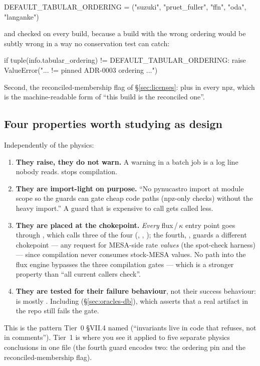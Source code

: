 \begin{srclisting}
DEFAULT_TABULAR_ORDERING = ("suzuki", "pruet_fuller", "ffn", "oda", "langanke")
\end{srclisting}

and checked on every build, because a build with the wrong ordering would be
subtly wrong in a way no conservation test can catch:

\begin{srclisting}
if tuple(info.tabular_ordering) != DEFAULT_TABULAR_ORDERING:
    raise ValueError("... != pinned ADR-0003 ordering ...")
\end{srclisting}

Second, the reconciled-membership flag of \S\ref{sec:licenses}:
 plus  in every
npz, which is the machine-readable form of ``this build is the reconciled one''.

\subsection{Four properties worth studying as design}
\label{sec:guard-design}

Independently of the physics:

\begin{enumerate}
\item \textbf{They raise, they do not warn.} A warning in a batch job is a log
      line nobody reads.  stops compilation.
\item \textbf{They are import-light on purpose.} ``No pynucastro import at
      module scope so the guards can gate cheap code paths (npz-only checks)
      without the heavy import.'' A guard that is expensive to call gets called
      less.
\item \textbf{They are placed at the chokepoint.} \emph{Every} flux\,/\,$\kappa$
      entry point goes through , which calls three of the
      four (, ,
      ); the fourth, ,
      guards a different chokepoint --- any request for MESA-side rate
      \emph{values} (the spot-check harness) --- since compilation never
      consumes stock-MESA values. No path into the flux engine bypasses the
      three compilation gates --- which is a stronger property than ``all
      current callers check''.
\item \textbf{They are tested for their failure behaviour}, not their success
      behaviour:  is mostly .
      Including 
      (\S\ref{sec:oracles-db}), which asserts that a real artifact in the repo
      still fails the gate.
\end{enumerate}

This is the pattern Tier~0 \S VII.4 named (``invariants live in code that
refuses, not in comments''). Tier~1 is where you see it applied to five separate
physics conclusions in one file (the fourth guard encodes two: the ordering pin
and the reconciled-membership flag).
